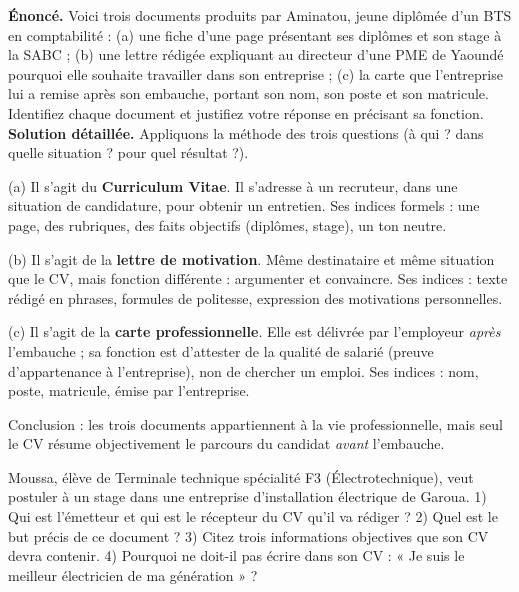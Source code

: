 \documentclass[11pt]{article}
\begin{document}
\begin{exoresolu}
\textbf{Énoncé.} Voici trois documents produits par Aminatou, jeune diplômée d'un BTS en comptabilité : (a) une fiche d'une page présentant ses diplômes et son stage à la SABC ; (b) une lettre rédigée expliquant au directeur d'une PME de Yaoundé pourquoi elle souhaite travailler dans son entreprise ; (c) la carte que l'entreprise lui a remise après son embauche, portant son nom, son poste et son matricule. Identifiez chaque document et justifiez votre réponse en précisant sa fonction.
\tcblower
\textbf{Solution détaillée.} Appliquons la méthode des trois questions (à qui ? dans quelle situation ? pour quel résultat ?).

(a) Il s'agit du \textbf{Curriculum Vitae}. Il s'adresse à un recruteur, dans une situation de candidature, pour obtenir un entretien. Ses indices formels : une page, des rubriques, des faits objectifs (diplômes, stage), un ton neutre.

(b) Il s'agit de la \textbf{lettre de motivation}. Même destinataire et même situation que le CV, mais fonction différente : argumenter et convaincre. Ses indices : texte rédigé en phrases, formules de politesse, expression des motivations personnelles.

(c) Il s'agit de la \textbf{carte professionnelle}. Elle est délivrée par l'employeur \emph{après} l'embauche ; sa fonction est d'attester de la qualité de salarié (preuve d'appartenance à l'entreprise), non de chercher un emploi. Ses indices : nom, poste, matricule, émise par l'entreprise.

Conclusion : les trois documents appartiennent à la vie professionnelle, mais seul le CV résume objectivement le parcours du candidat \emph{avant} l'embauche.
\end{exoresolu}

\begin{exercice}
Moussa, élève de Terminale technique spécialité F3 (Électrotechnique), veut postuler à un stage dans une entreprise d'installation électrique de Garoua. 1) Qui est l'émetteur et qui est le récepteur du CV qu'il va rédiger ? 2) Quel est le but précis de ce document ? 3) Citez trois informations objectives que son CV devra contenir. 4) Pourquoi ne doit-il pas écrire dans son CV : « Je suis le meilleur électricien de ma génération » ?
\end{exercice}
\end{document}
